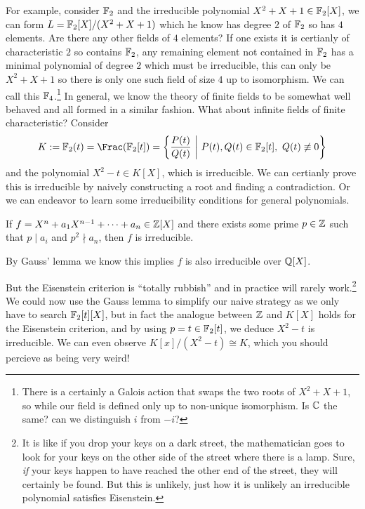 \documentclass{article}
\begin{document}
For example, consider $\mathbb{F}_2$ and the irreducible polynomial $X^2+X+1\in\mathbb{F}_2[X]$, we can form $L = \mathbb{F}_2[X]/(X^2+X+1)$ which he know has degree $2$ of $\mathbb{F}_2$ so has $4$ elements. Are there any other fields of $4$ elements? If one exists it is certianly of characteristic $2$ so contains $\mathbb{F}_2$, any remaining element not contained in $\mathbb{F}_2$ has a minimal polynomial of degree $2$ which must be irreducible, this can only be $X^2+X+1$ so there is only one such field of size $4$ up to isomorphism. We can call this $\mathbb{F}_4$.\footnote{There is a certainly a Galois action that swaps the two roots of $X^2+X+1$, so while our field is defined only up to non-unique isomorphism. Is $\mathbb{C}$ the same? can we distinguish $i$ from $-i$?} In general, we know the theory of finite fields to be somewhat well behaved and all formed in a similar fashion. What about infinite fields of finite characteristic? Consider \[
    K := \bF_2(t) = \Frac(\bF_2[t]) = \left\{ \frac{P(t)}{Q(t)} \ \middle| \ P(t),Q(t)\in \bF_2[t], \ Q(t)\not\equiv 0\right\}
\] and the polynomial $X^2-t\in K[X]$, which is irreducible. We can certianly prove this is irreducible by naively constructing a root and finding a contradiction. Or we can endeavor to learn some irreducibility conditions for general polynomials.

\begin{proposition}
    If $f = X^n + a_1X^{n-1} + \cdots + a_n \in \mathbb{Z}[X]$ and there exists some prime $p\in \mathbb{Z}$ such that $p\mid a_i$ and $p^2 \nmid a_n$, then $f$ is irreducible.
\end{proposition}

\begin{corollary}
    By Gauss' lemma we know this implies $f$ is also irreducible over $\mathbb{Q}[X]$.
\end{corollary}

But the Eisenstein criterion is ``totally rubbish'' and in practice will rarely work.\footnote{It is like if you drop your keys on a dark street, the mathematician goes to look for your keys on the other side of the street where there is a lamp. Sure, \textit{if} your keys happen to have reached the other end of the street, they will certainly be found. But this is unlikely, just how it is unlikely an irreducible polynomial satisfies Eisenstein.} We could now use the Gauss lemma to simplify our naive strategy as we only have to search $\mathbb{F}_2[t][X]$, but in fact the analogue between $\mathbb{Z}$ and $K[X]$ holds for the Eisenstein criterion, and by using $p=t\in\mathbb{F}_2[t]$, we deduce $X^2-t$ is irreducible. We can even observe $K[x]/(X^2-t)\cong K$, which you should percieve as being very weird!
\end{document}
